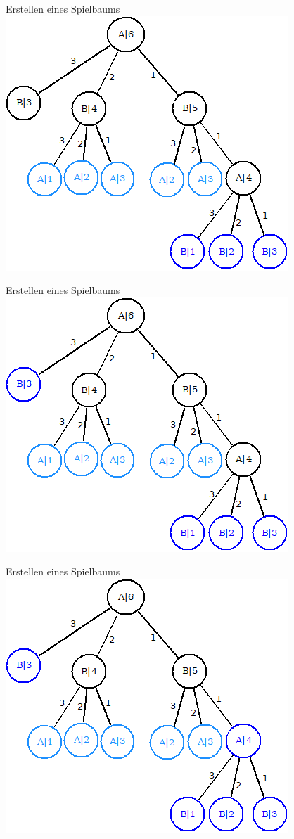 \documentclass[18pt]{beamer}
\begin{document}
\begin{frame}{Erstellen eines Spielbaums}
\includegraphics[scale=0.4]{baum13.png}
\end{frame}

\begin{frame}{Erstellen eines Spielbaums}
\includegraphics[scale=0.4]{baum14.png}
\end{frame}

\begin{frame}{Erstellen eines Spielbaums}
\includegraphics[scale=0.4]{baum15.png}
\end{frame}
\end{document}
